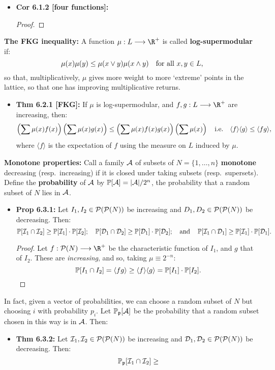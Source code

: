 \documentclass[11pt]{article}
\newenvironment{INT}[1][]{\begin{itemize}\small\item\textbf{#1}}{\end{itemize}}
\begin{document}
\begin{chapter6}
\begin{itemise}
\begin{INT}[Cor 6.1.2 {[four functions]}:]
\begin{proof}
\end{proof}
\end{INT}
\item \textbf{The FKG inequality:} A function $\mu:L\to\R^+$ is called \textbf{log-supermodular} if:
\[\mu(x)\mu(y)\leq\mu(x\vee y)\mu(x\wedge y)\textup{\quad for all $x,y\in L$,}\]
so that, multiplicatively, $\mu$ gives more weight to more `extreme' points in the lattice, so that one has improving multiplicative returns.
\begin{INT}[Thm 6.2.1 {[FKG]}:]
If $\mu$ is log-supermodular, and $f,g:L\to\R^+$ are increasing, then:
\[\left(\sum\mu(x)f(x)\right)\left(\sum\mu(x)g(x)\right)
\leq\left(\sum\mu(x)f(x)g(x)\right)\left(\sum\mu(x)\right)\textup{\quad i.e.\quad }\langle f\rangle\langle g\rangle\leq\langle fg\rangle,\]
where $\langle f\rangle$ is the expectation of $f$ using the measure on $L$ induced by $\mu$.
\end{INT}
\item \textbf{Monotone properties:} Call a family $\mathcal{A}$ of subsets of $N=\{1,\ldots,n\}$ \textbf{monotone} decreasing (resp.\ increasing) if it is closed under taking subsets (resp.\ supersets). Define the \textbf{probability} of $\mathcal{A}$ by $\operatorname{\mathbb{P}}[\mathcal{A}]=|\mathcal{A}|/2^n$, the probability that a random subset of $N$ lies in $\mathcal{A}$.
\begin{INT}[Prop 6.3.1:]
Let $I_1,I_2\in\mathcal{P}(\mathcal{P}(N))$ be increasing and $D_1,D_2\in\mathcal{P}(\mathcal{P}(N))$ be decreasing. Then:
\[\operatorname{\mathbb{P}}[\mathcal{I}_1\cap\mathcal{I}_2]\geq\operatorname{\mathbb{P}}[\mathcal{I}_1]\cdot\operatorname{\mathbb{P}}[\mathcal{I}_2];\quad \operatorname{\mathbb{P}}[\mathcal{D}_1\cap\mathcal{D}_2]\geq\operatorname{\mathbb{P}}[\mathcal{D}_1]\cdot\operatorname{\mathbb{P}}[\mathcal{D}_2];\quad\textup{and}\quad  \operatorname{\mathbb{P}}[\mathcal{I}_1\cap\mathcal{D}_1]\geq\operatorname{\mathbb{P}}[\mathcal{I}_1]\cdot\operatorname{\mathbb{P}}[\mathcal{D}_1].\]
\begin{proof}
Let $f:\calP(N)\to\R^+$ be the characteristic function of $I_1$, and $g$ that of $I_2$. These are \emph{increasing}, and so, taking $\mu\equiv2^{-n}$:
\[\operatorname{\mathbb{P}}[I_1\cap I_2]=\langle fg\rangle\geq\langle f\rangle\langle g\rangle=\operatorname{\mathbb{P}}[I_1]\cdot\operatorname{\mathbb{P}}[I_2].\qedhere\]
\end{proof}
\end{INT}
In fact, given a vector  of probabilities, we can choose a random subset of $N$ but choosing $i$ with probability $p_i$. Let $\operatorname{\mathbb{P}}_{\mathfrak{p}}[\mathcal{A}]$ be the probability that a random subset chosen in this way is in $\mathcal{A}$. Then:
\begin{INT}[Thm 6.3.2:]
Let $\mathcal{I}_1,\mathcal{I}_2\in\mathcal{P}(\mathcal{P}(N))$ be increasing and $\mathcal{D}_1,\mathcal{D}_2\in\mathcal{P}(\mathcal{P}(N))$ be decreasing. Then:
\[\operatorname{\mathbb{P}}_{\mathfrak{p}}[\mathcal{I}_1\cap\mathcal{I}_2]\geq
\]
\end{INT}
\end{itemise}
\end{chapter6}
\end{document}
